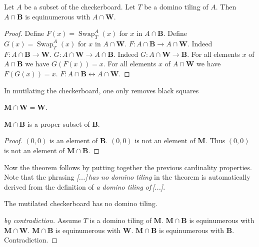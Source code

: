 \documentclass[english]{article}
\newcommand{\Mutilated}{\mathbf{M}}
\newcommand{\Black}{\mathbf{B}}
\newcommand{\White}{\mathbf{W}}
\newcommand{\Sw}[3]{\operatorname{Swap}_{#1}^{#2}(#3)}
\begin{document}
\begin{forthel}
    \begin{lemma}
        Let $A$ be a subset of the checkerboard.
        Let $T$ be a domino tiling of $A$.
        Then $A \cap \Black$ is
        equinumerous with $A \cap \White$.
    \end{lemma}
    \begin{proof}
        Define $F(x) = \Sw{T}{A}{x}$ for $x$ in $A \cap \Black$.
        Define $G(x) = \Sw{T}{A}{x}$ for $x$ in $A \cap \White$.
        $F: A \cap \Black \to A \cap \White$.
        Indeed  $F: A \cap \Black \to \White$.
        $G: A \cap \White \to A \cap \Black$.
        Indeed  $G: A \cap \White \to \Black$.
        For all elements $x$ of $A \cap \Black$ we have $G(F(x))=x$.
        For all elements $x$ of $A \cap \White$ we have $F(G(x))=x$.
        $F : A \cap \Black \leftrightarrow A \cap \White$.
    \end{proof}
\end{forthel}

\noindent In mutilating the checkerboard, one only removes black squares

\begin{forthel}
  \begin{lemma}
      $\Mutilated \cap \White = \White$.
  \end{lemma}

\begin{lemma}
    $\Mutilated\cap\Black$ is a proper subset of $\Black$.
\end{lemma}
\begin{proof}
    $(0,0)$ is an element of $\Black$.
    $(0,0)$ is not an element of $\Mutilated$.
    Thus $(0,0)$ is not an element of $\Mutilated\cap \Black$.
\end{proof}
\end{forthel}

\noindent Now the theorem follows by putting together the previous cardinality properties.
Note that the phrasing \textit{[...]\,has no domino tiling} in the theorem is automatically
derived from the definition of \textit{a domino tiling of\,[...]}.

\begin{forthel}
    \begin{theorem}
        The mutilated checkerboard has no domino tiling.
    \end{theorem}
    \begin{proof}[by contradiction]
        Assume $T$ is a domino tiling of $\Mutilated$.
        $\Mutilated \cap \Black$ is equinumerous with $\Mutilated \cap \White$.
        $\Mutilated \cap \Black$ is equinumerous with $\White$.
        $\Mutilated \cap \Black$ is equinumerous with $\Black$.
        Contradiction.
    \end{proof}
\end{forthel}
\end{document}
